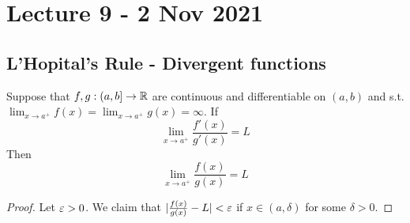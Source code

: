 \section{Lecture 9 - 2 Nov 2021}
\subsection{L'Hopital's Rule - Divergent functions}
\begin{theorem}
  Suppose that $f,g:(a,b]\to\mathbb R$ are continuous and differentiable on $(a,b)$ and s.t.
  $\lim_{x\to a^+} f(x)=\lim_{x\to a^+} g(x)=\infty$. If 
  \[\lim_{x\to a^+} \frac{f'(x)}{g'(x)} =L\]
  Then
  \[\lim_{x\to a^+} \frac{f(x)}{g(x)} =L\]
  \label{<+label+>}
\end{theorem}
\begin{proof}
  Let $\varepsilon>0$. We claim that $|\frac{f(x)}{g(x)}-L|<\varepsilon$ if $x\in (a,\delta)$ for some
  $\delta>0$.


\end{proof}
